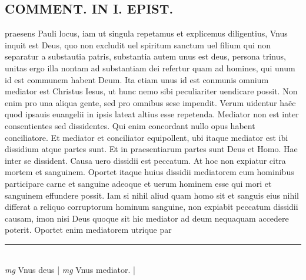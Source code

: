 \documentclass{article}
\begin{document}
\begin{pages}
\section*{COMMENT. IN I. EPIST. }\pstart praesens Pauli locus, iam ut singula repetamus et explicemus diligentius, Vnus inquit est Deus, quo non excludit uel spiritum sanctum uel filium qui non separatur a substautia patris, substantia autem unus est deus, persona trinus, unitas ergo illa nontam ad substantiam dei refertur quam ad homines, qui unum id est communem habent Deum. Ita etiam unus id est conmunis omnium mediator est Christus Iesus, ut hunc nemo sibi peculiariter uendicare possit. Non enim pro una aliqua gente, sed pro omnibus sese impendit. Verum uidentur haẽc quod ipsauis euangelii in ipsis lateat altius esse repetenda. Mediator non est inter consentientes sed dissidentes. Qui enim concordant nullo opus habent conciliatore. Et mediator et conciliator equipollent, ubi itaque mediator est ibi dissidium atque partes sunt. Et in praesentiarum partes sunt Deus et Homo. Hae inter se dissident. Causa uero dissidii est peccatum. At hoc non expiatur citra mortem et sanguinem. Oportet itaque huius dissidii mediatorem cum hominibus participare carne et sanguine adeoque et uerum hominem esse qui mori et sanguinem effundere possit. Iam si nihil aliud quam homo sit et sanguis eius nihil differat a reliquo corruptorum hominum sanguine, non expiabit peccatum dissidii causam, imon nisi Deus quoque sit hic mediator ad deum nequaquam accedere poterit. Oportet enim mediatorem utrique par\pend
\vspace{0.5cm}\noindent
\vspace{0.2cm}\rule{1cm}{0.2pt}\\ 
\hspace{0.2cm}\textit{mg}
\footnotesize Vnus deus 
\normalsize| 
\hspace{0.2cm}\textit{mg}
\footnotesize Vnus mediator. 
\normalsize| 

\end{pages}
\end{document}
